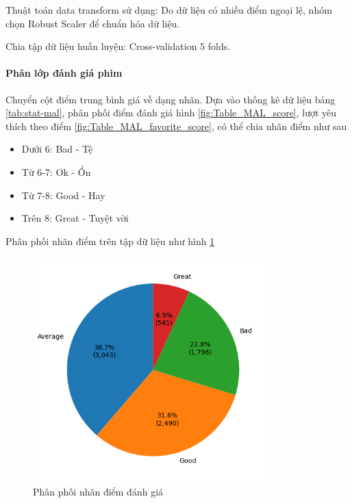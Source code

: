     Thuật toán data transform sử dụng: Do dữ liệu có nhiều điểm ngoại lệ, nhóm chọn Robust Scaler để chuẩn hóa dữ liệu.

    Chia tập dữ liệu huấn luyện: Cross-validation 5 folds.
    

    \paragraph{Phân lớp đánh giá phim}
    \leavevmode

    Chuyển cột điểm trung bình giá về dạng nhãn. Dựa vào thống kê dữ liệu bảng \ref{tab:stat-mal}, phân phối điểm đánh giá hình \ref{fig:Table_MAL_score}, lượt yêu thích theo điểm \ref{fig:Table_MAL_favorite_score}, có thể chia nhãn điểm như sau
    \begin{itemize}
        \item Dưới 6: Bad - Tệ
        \item Từ 6-7: Ok - Ổn
        \item Từ 7-8: Good - Hay
        \item Trên 8: Great - Tuyệt vời
    \end{itemize}

    Phân phối nhãn điểm trên tập dữ liệu như hình \ref{fig:Table_MAL_score_label}

    \begin{figure}[htp]
        \centering
        \includegraphics[width=0.80\textwidth]{images/Table_MAL_score_label.png}
        \caption{Phân phối nhãn điểm đánh giá}
        \label{fig:Table_MAL_score_label}
    \end{figure}

